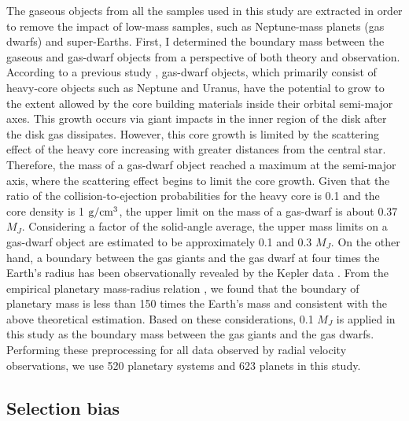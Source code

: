 \documentclass[twocolumn, dvipdfmx]{aastex62}
\begin{document}
\begin{CJK*}{UTF8}{min}
The gaseous objects from all the samples used in this study are extracted in order to remove the impact of low-mass samples, such as Neptune-mass planets (gas dwarfs) and super-Earths. First, I determined the boundary mass between the gaseous and gas-dwarf objects from a perspective of both theory and observation. According to a previous study \citep{2004ApJ...604..388I}, gas-dwarf objects, which primarily consist of heavy-core objects such as Neptune and Uranus, have the potential to grow to the extent allowed by the core building materials inside their orbital semi-major axes. This growth occurs via giant impacts in the inner region of the disk after the disk gas dissipates. However, this core growth is limited by the scattering effect of the heavy core increasing with greater distances from the central star. Therefore, the mass of a gas-dwarf object reached a maximum at the semi-major axis, where the scattering effect begins to limit the core growth. Given that the ratio of the collision-to-ejection probabilities for the heavy core is 0.1 and the core density is 1 $\rm g/cm^3$, the upper limit on the mass of a gas-dwarf is about 0.37 $M_J$. Considering a factor of the solid-angle average, the upper mass limits on a gas-dwarf object are estimated to be approximately 0.1 and 0.3 $M_J$. On the other hand, a boundary between the gas giants and the gas dwarf at four times the Earth's radius has been observationally revealed by the Kepler data \citep{2012Natur.486..375B}. From the empirical planetary mass-radius relation \cite{2013ApJ...768...14W}, we found that the boundary of planetary mass is less than 150 times the Earth's mass and consistent with the above theoretical estimation. Based on these considerations, 0.1 $M_J$ is applied in this study as the boundary mass between the gas giants and the gas dwarfs. Performing these preprocessing for all data observed by radial velocity observations, we use 520 planetary systems and 623 planets in this study.


\subsection{Selection bias} \label{subsec:bias}


\end{CJK*}
\end{document}
